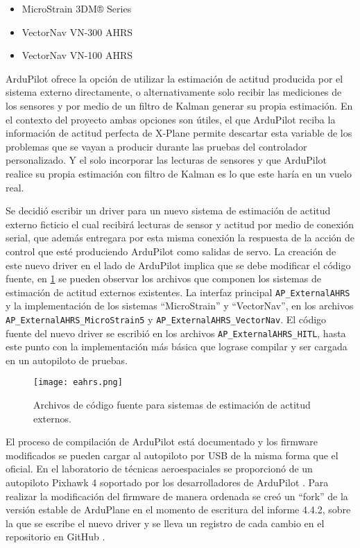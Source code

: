 \begin{itemize}
    \item MicroStrain 3DM® Series
    \item VectorNav VN-300 AHRS
    \item VectorNav VN-100 AHRS
\end{itemize}

ArduPilot ofrece la opción de utilizar la estimación de actitud producida por el sistema externo directamente, o alternativamente solo recibir las mediciones de los sensores y por medio de un filtro de Kalman generar su propia estimación. En el contexto del proyecto ambas opciones son útiles, el que ArduPilot reciba la información de actitud perfecta de X-Plane permite descartar esta variable de los problemas que se vayan a producir durante las pruebas del controlador personalizado. Y el solo incorporar las lecturas de sensores y que ArduPilot realice su propia estimación con filtro de Kalman es lo que este haría en un vuelo real.

Se decidió escribir un driver para un nuevo sistema de estimación de actitud externo ficticio el cual recibirá lecturas de sensor y actitud por medio de conexión serial, que además entregara por esta misma conexión la respuesta de la acción de control que esté produciendo ArduPilot como salidas de servo. La creación de este nuevo driver en el lado de ArduPilot implica que se debe modificar el código fuente, en \cref{fig:eahrs} se pueden observar los archivos que componen los sistemas de estimación de actitud externos existentes. La interfaz principal \texttt{AP\_ExternalAHRS} y la implementación de los sistemas ``MicroStrain'' y ``VectorNav'', en los archivos \texttt{AP\_ExternalAHRS\_MicroStrain5} y \texttt{AP\_ExternalAHRS\_VectorNav}. El código fuente del nuevo driver se escribió en los archivos \texttt{AP\_ExternalAHRS\_HITL}, hasta este punto con la implementación más básica que lograse compilar y ser cargada en un autopiloto de pruebas.

\begin{figure}[h]
    \centering
    \texttt{[image: eahrs.png]}
    \caption{Archivos de código fuente para sistemas de estimación de actitud externos.}
    \label{fig:eahrs}
\end{figure}

El proceso de compilación de ArduPilot está documentado \cite{ap-build} y los firmware modificados se pueden cargar al autopiloto por USB de la misma forma que el oficial. En el laboratorio de técnicas aeroespaciales se proporcionó de un autopiloto Pixhawk 4 soportado por los desarrolladores de ArduPilot \cite{pixhawk4}. Para realizar la modificación del firmware de manera ordenada se creó un ``fork'' de la versión estable de ArduPlane en el momento de escritura del informe 4.4.2, sobre la que se escribe el nuevo driver y se lleva un registro de cada cambio en el repositorio en GitHub \cite{ap-hitl-fork}.

